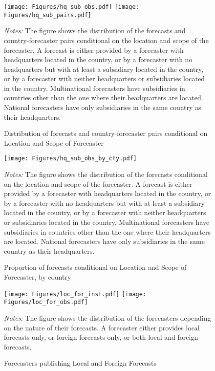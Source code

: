 \begin{figure}[h]
		\centering
		\texttt{[image: Figures/hq\_sub\_obs.pdf]}
		\texttt{[image: Figures/hq\_sub\_pairs.pdf]}
	\caption{Distribution of forecasts and country-forecaster pairs conditional on Location and Scope of Forecaster}
	\label{fig:hq_sub_obs}
	\begin{fignote}
		\textit{Notes:} The figure shows the distribution of the forecasts and country-forecaster pairs conditional on the location and scope of the forecaster. A forecast is either provided by a forecaster with headquarters located in the country, or by a forecaster with no headquarters but with at least a subsidiary located in the country, or by a forecaster with neither headquarters or subsidiaries located in the country. Multinational forecasters have subsidiaries in countries other than the one where their headquarters are located. National forecasters have only subsidiaries in the same country as their headquarters.
	\end{fignote}
\end{figure}

\begin{figure}[h]
		\centering
		\texttt{[image: Figures/hq\_sub\_obs\_by\_cty.pdf]}
	\caption{Proportion of forecasts conditional on Location and Scope of Forecaster, by country}
	\label{fig:hq_sub_obs_by_cty}
	\begin{fignote}
		\textit{Notes:} The figure shows the distribution of the forecasts conditional on the location and scope of the forecaster. A forecast is either provided by a forecaster with headquarters located in the country, or by a forecaster with no headquarters but with at least a subsidiary located in the country, or by a forecaster with neither headquarters or subsidiaries located in the country. Multinational forecasters have subsidiaries in countries other than the one where their headquarters are located. National forecasters have only subsidiaries in the same country as their headquarters.
	\end{fignote}
\end{figure}

\begin{figure}[h]
		\centering
		\texttt{[image: Figures/loc\_for\_inst.pdf]}
		\texttt{[image: Figures/loc\_for\_obs.pdf]}	
	\caption{Forecasters publishing Local and Foreign Forecasts}
	\label{fig:loc_for}
	\begin{fignote}
		\textit{Notes:} The figure shows the distribution of the forecasters depending on the nature of their forecasts. A forecaster either provides local forecasts only, or foreign forecasts only, or both local and foreign forecasts.
	\end{fignote}
\end{figure}

